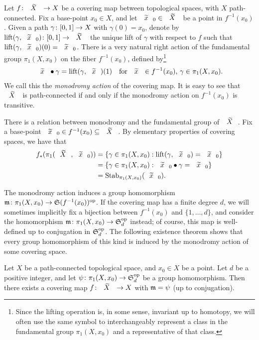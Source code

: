 Let $\map{f}{\wtilde{X}}{X}$ be a covering map between topological spaces, with $X$ path-connected. Fix a base-point $x_0\in X$, and let $\wtilde{x}_0\in\wtilde{X}$ be a point in $f^{-1}(x_0)$. Given a path $\map{\gamma}{[0,1]}{X}$ with $\gamma(0)=x_0$, denote by $\map{\lift{\gamma}{\wtilde{x}_0}}{[0,1]}{\wtilde{X}}$ the unique lift of $\gamma$ with respect to $f$ such that $\lift{\gamma}{\wtilde{x}_0}(0)=\wtilde{x}_0$. There is a very natural right action of the fundamental group $\pi_1(X,x_0)$ on the fiber $f^{-1}(x_0)$, defined by\footnote{Since the lifting operation is, in some sense, invariant up to homotopy, we will often use the same symbol to interchangeably represent a class in the fundamental group $\pi_1(X,x_0)$ and a representative of that class.}
\begin{align*}
\wtilde{x}\mon\gamma=\lift{\gamma}{\wtilde{x}}(1)&&\text{for $\wtilde{x}\in f^{-1}(x_0)$, $\gamma\in\pi_1(X,x_0)$.}
\end{align*}
We call this the \emph{monodromy action} of the covering map. It is easy to see that $\wtilde{X}$ is path-connected if and only if the monodromy action on $f^{-1}(x_0)$ is transitive.

There is a relation between monodromy and the fundamental group of $\wtilde{X}$. Fix a base-point $\wtilde{x}_0\in f^{-1}(x_0)\subs\wtilde{X}$. By elementary properties of covering spaces, we have that
\begin{align*}
f_*(\pi_1(\wtilde{X},\wtilde{x}_0))&=\{\gamma\in\pi_1(X,x_0):\lift{\gamma}{\wtilde{x}_0}=\wtilde{x}_0\}\\
&=\{\gamma\in\pi_1(X,x_0):\wtilde{x}_0\mon\gamma=\wtilde{x}_0\}\\
&=\stab{\pi_1(X,x_0)}{\wtilde{x}_0}.
\end{align*}

The monodromy action induces a group homomorphism $\map{\Mon}{\pi_1(X,x_0)}{\op{\symgroup(f^{-1}(x_0))}}$. If the covering map has a finite degree $d$, we will sometimes implicitly fix a bijection between $f^{-1}(x_0)$ and $\{1,\ldots,d\}$, and consider the homomorphism $\map{\Mon}{\pi_1(X,x_0)}{\op{\symgroup[d]}}$ instead; of course, this map is well-defined up to conjugation in $\op{\symgroup[d]}$. The following existence theorem shows that every group homomorphism of this kind is induced by the monodromy action of some covering space.

\begin{theorem}\label{hurwitz:th:covering-with-given-monodromy}
Let $X$ be a path-connected topological space, and $x_0\in X$ be a point. Let $d$ be a positive integer, and let $\map{\psi}{\pi_1(X,x_0)}{\op{\symgroup[d]}}$ be a group homomorphism. Then there exists a covering map $\map{f}{\wtilde{X}}{X}$ with $\mathfrak{m}=\psi$ (up to conjugation).
\end{theorem}

